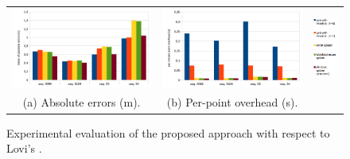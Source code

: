  
\begin{figure}[t]
\centering
  \begin{tabular}{ccc}
    \centering
    \includegraphics[height=0.25\textwidth]{./img/results.pdf}&
    \includegraphics[height=0.25\textwidth]{./img/resultsTiming.pdf}&
    \includegraphics[height=0.22\textwidth]{./img/legenda}\\
    (a) Absolute errors (m).&
    (b) Per-point overhead (s).&\\
  \end{tabular}
  \caption{Experimental evaluation of the proposed approach with respect to Lovi's \cite{lovi_et_al_11}.}
   \label{tab:results}
\end{figure}


